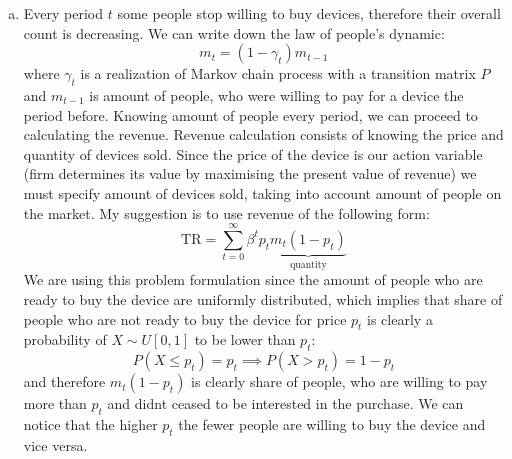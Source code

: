 \documentclass[11pt, oneside]{article}
\renewcommand{\b}{\beta}
\newcommand{\g}{\gamma}
\begin{document}
\begin{enumerate}[(a)]
	\item Every period $ t $ some people stop willing to buy devices, therefore their overall count is decreasing. We can write down the law of people's dynamic:
	\[
	m_{t} = (1-\g_{t})m_{t-1}
	\]
	where $ \g_{t} $ is a realization of Markov chain process with a transition matrix $ P $ and $ m_{t-1} $ is amount of people, who were willing to pay for a device the period before.  Knowing amount of people every period, we can proceed to calculating the revenue. Revenue calculation consists of knowing the price and quantity of devices sold. Since the price of the device is our action variable (firm determines its value by maximising the present value of revenue) we must specify amount of devices sold, taking into account amount of people on the market. My suggestion is to use revenue of the following form:
	\[
	\text{TR} = \sum_{t=0}^{\infty}\b^{t} p_{t}\underbrace{m_{t}(1-p_{t})}_{\text{quantity}}
	\]
	We are using this problem formulation since the amount of people who are ready to buy the device are uniformly distributed, which implies that share of people who are not ready to buy the device for price $ p_{t} $ is clearly a probability of $ X\sim U[0, 1] $ to be lower than $ p_{t} $:
	\[
		P(X\le p_{t}) = p_{t} \implies P(X > p_{t}) = 1 - p_{t}
	\]
	and therefore $ m_{t}(1-p_{t}) $ is clearly share of people, who are willing to pay more than $ p_{t} $ and didnt ceased to be interested in the purchase. We can notice that the higher $ p_{t} $ the fewer people are willing to buy the device and vice versa.
	

\end{enumerate}
\end{document}
